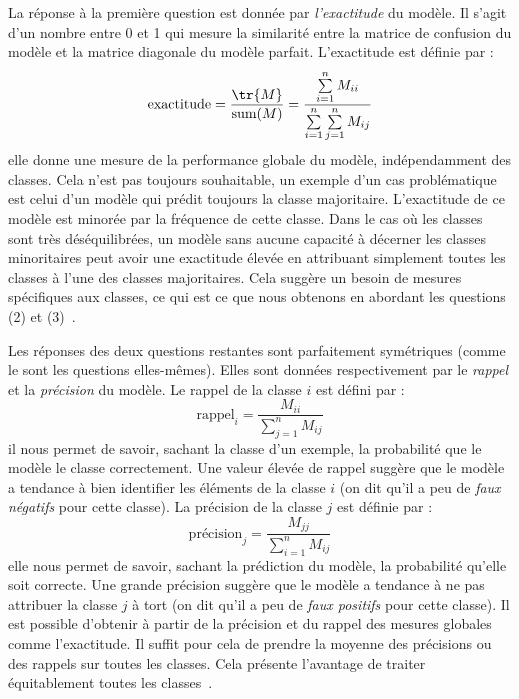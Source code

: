 La réponse à la première question est donnée par \emph{l'exactitude} du modèle.
Il s'agit d'un nombre entre 0 et 1 qui mesure la similarité entre 
la matrice de confusion du modèle et la matrice diagonale du modèle parfait.
L'exactitude est définie par :
\begin{equation}
    \label{eq.accuracy}
    \text{exactitude} =  \frac{\tr{M}}{\text{sum}(M)} 
                      = \frac{\sum\limits_{i=1}^n M_{ii}}{\sum\limits_{i=1}^n \sum\limits_{j=1}^n M_{ij}}
\end{equation}
elle donne une mesure de la performance globale du modèle, indépendamment des classes.
Cela n'est pas toujours souhaitable,
un exemple d'un cas problématique est celui d'un modèle qui prédit toujours la classe majoritaire.
L'exactitude de ce modèle est minorée par la fréquence de cette classe.
Dans le cas où les classes sont très déséquilibrées,
un modèle sans aucune capacité à décerner les classes minoritaires peut avoir une exactitude élevée
en attribuant simplement toutes les classes à l'une des classes majoritaires.
Cela suggère un besoin de mesures spécifiques aux classes,
ce qui est ce que nous obtenons en abordant les questions (2) et (3)~\cite{Raschka_Mirjalili_2017}.

Les réponses des deux questions restantes sont parfaitement symétriques (comme le sont les questions elles-mêmes).
Elles sont données respectivement par le \emph{rappel} et la \emph{précision} du modèle.
Le rappel de la classe \(i\) est défini par :
\begin{equation}
    \label{eq.recall}
    \text{rappel}_i = \frac{M_{ii}}{\sum\limits_{j=1}^n M_{ij}}
\end{equation}
il nous permet de savoir, sachant la classe d'un exemple, la probabilité que le modèle le classe correctement.
Une valeur élevée de rappel suggère que le modèle a tendance à bien identifier les éléments de la classe \(i\)
(on dit qu'il a peu de \emph{faux négatifs} pour cette classe).
La précision de la classe \(j\) est définie par :
\begin{equation}
    \label{eq.precision}
    \text{précision}_j = \frac{M_{jj}}{\sum\limits_{i=1}^n M_{ij}}
\end{equation}
elle nous permet de savoir, sachant la prédiction du modèle, la probabilité qu'elle soit correcte.
Une grande précision suggère que le modèle a tendance à ne pas attribuer la classe \(j\) à tort
(on dit qu'il a peu de \emph{faux positifs} pour cette classe).
Il est possible d'obtenir à partir de la précision et du rappel des mesures globales comme l'exactitude.
Il suffit pour cela de prendre la moyenne des précisions ou des rappels sur toutes les classes.
Cela présente l'avantage de traiter équitablement toutes les classes~\cite{Raschka_Mirjalili_2017}.


